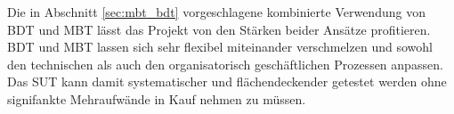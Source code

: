 Die in Abschnitt \ref{sec:mbt_bdt} vorgeschlagene kombinierte Verwendung von \Gls{BDT} und \Gls{MBT} lässt das Projekt von den Stärken beider Ansätze profitieren. \Gls{BDT} und \Gls{MBT} lassen sich sehr flexibel miteinander verschmelzen und sowohl den technischen als auch den organisatorisch geschäftlichen Prozessen anpassen. Das \Gls{SUT} kann damit systematischer und flächendeckender getestet werden ohne signifankte Mehraufwände in Kauf nehmen zu müssen.











